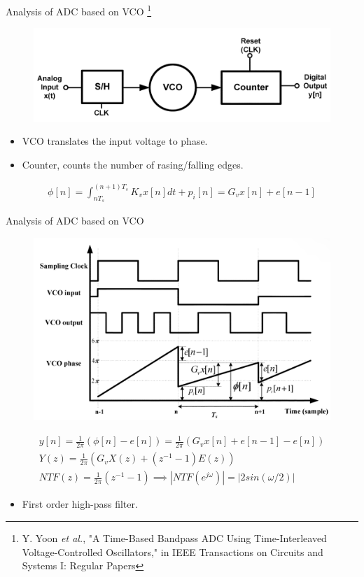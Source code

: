 \documentclass{beamer}
\begin{document}
\begin{frame}{Analysis of ADC based on VCO \footnote[frame]{Y. Yoon \textit{et al.}, "A Time-Based Bandpass ADC Using Time-Interleaved Voltage-Controlled Oscillators," in IEEE Transactions on Circuits and Systems I: Regular Papers}}
\begin{figure}
	\includegraphics[scale=0.3]{./figs/Vco .png}
\end{figure}
\pause
\begin{itemize}
	\item VCO translates the input voltage to phase.
	\pause
	\item Counter, counts the number of rasing/falling edges.
\end{itemize}
\begin{gather*}
	\phi [n] = \int_{nT_s}^{(n+1)T_s}K_vx[n]dt + p_i[n] = G_vx[n] + e[n-1]
\end{gather*}
\end{frame}

\begin{frame}{Analysis of ADC based on VCO}
\begin{figure}
	\includegraphics[scale=0.25]{./figs/Vcoplot.png}
\end{figure}
\vspace{-0.9cm}
\pause
\begin{gather*}
	y[n] = \frac{1}{2\pi}(\phi [n] - e[n]) = \frac{1}{2\pi}(G_vx[n] + e[n-1] - e[n])\\
	Y(z) = \frac{1}{2\pi}(G_vX(z) + (z^{-1} - 1)E(z))\\
	NTF(z) = \frac{1}{2\pi}(z^{-1} - 1) \implies |NTF(e^{j\omega})| = |2sin(\omega /2)|
\end{gather*}
\pause
\vspace{-1cm}
\begin{itemize}
	\item First order high-pass filter.
\end{itemize}
\end{frame}
\end{document}

